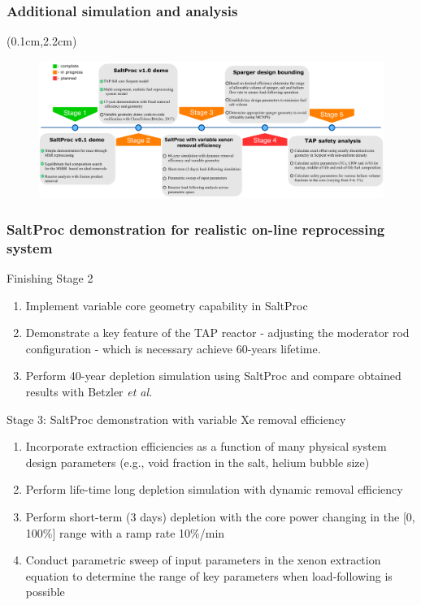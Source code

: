 \begin{frame}
\frametitle{Additional simulation and analysis}       
\begin{textblock*}{12.5cm}(0.1cm,2.2cm) %
	\begin{figure}[ht!] %
		\includegraphics[width=\textwidth]{./images/progress_chart.pdf} 
	\end{figure}
\end{textblock*}
\end{frame}


\begin{frame}
\frametitle{SaltProc demonstration for realistic on-line reprocessing system}
	\begin{block}{Finishing Stage 2}
		\begin{enumerate}
			\item Implement variable core geometry capability in SaltProc
			\item Demonstrate a key feature of
the \gls{TAP} reactor - 
			adjusting the moderator rod configuration - which is necessary 
			achieve 60-years lifetime.
			\item Perform 40-year depletion simulation using SaltProc 
			and compare obtained results with Betzler \emph{et al.} 
			\cite{betzler_assessment_2017}
		\end{enumerate}
	\end{block}
	
	\begin{block}{Stage 3: SaltProc demonstration with variable Xe removal 
	efficiency}
		\begin{enumerate}
			\item Incorporate extraction efficiencies as a function of many 
			physical system design
parameters (e.g., void fraction in the 
			salt, helium bubble size)
			\item Perform life-time long depletion simulation with dynamic 
			removal efficiency
			\item Perform short-term (3 days) depletion with the core power 
			changing in the [0, 100\%] range with a ramp rate 10\%/min
			\item Conduct parametric sweep of input parameters in the xenon 
			extraction equation to determine the range of key parameters when 
			load-following is possible
		\end{enumerate}
	\end{block}
\end{frame}


